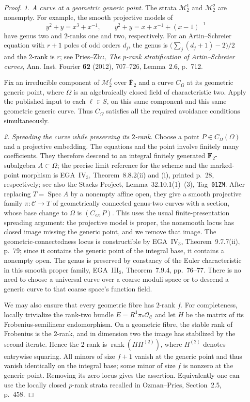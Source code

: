 \begin{proof}
\emph{1. A curve at a geometric generic point.}
The strata $\mathcal M_2^1$ and $\mathcal M_2^2$ are nonempty.  For
example, the smooth projective models of
\[
 y^2+y=x^3+x^{-1},\qquad
 y^2+y=x+x^{-1}+(x-1)^{-1}
\]
have genus two and $2$-ranks one and two, respectively.  For an
Artin--Schreier equation with $r+1$ poles of odd orders $d_j$, the
genus is $\bigl(\sum_j(d_j+1)-2\bigr)/2$ and the $2$-rank is $r$;
see Pries--Zhu, \emph{The $p$-rank stratification of Artin--Schreier
curves}, Ann. Inst. Fourier \textbf{62} (2012), 707--726,
Lemma~2.6, p.~712.

Fix an irreducible component of $\mathcal M_2^f$ over
$\overline{\mathbf F}_2$ and a curve $C_\Omega$ at its geometric generic
point, where $\Omega$ is an algebraically closed field of characteristic
two.  Apply the published input to each $\ell\in S$, on this same
component and this same geometric generic curve.  Thus $C_\Omega$
satisfies all the required avoidance conditions simultaneously.

\emph{2. Spreading the curve while preserving its $2$-rank.}
Choose a point $P\in C_\Omega(\Omega)$ and a projective embedding.
The equations and the point involve finitely many coefficients.
They therefore descend to an integral finitely generated
$\mathbf F_2$-subalgebra $A\subset\Omega$; the precise limit reference
for the scheme and the marked-point morphism is EGA~IV$_3$,
Theorem~8.8.2(ii) and (i), printed p.~28, respectively;
see also the Stacks Project, Lemma~32.10.1(1)--(3),
Tag~\texttt{01ZM}.
After replacing
$T=\operatorname{Spec}A$ by a nonempty affine open, they give a smooth
projective family $\pi:\mathcal C\to T$ of geometrically connected
genus-two curves with a section, whose base change to $\Omega$ is
$(C_\Omega,P)$.  This uses the usual finite-presentation spreading
argument: the projective model is proper, the nonsmooth locus has
closed image missing the generic point, and we remove that image.
The geometric-connectedness locus is constructible by EGA~IV$_3$,
Theorem~9.7.7(ii), p.~79; since it contains the generic point of
the integral base, it contains a nonempty open.  The genus is
preserved by constancy of the Euler characteristic in this smooth
proper family, EGA~III$_2$, Theorem~7.9.4, pp.~76--77.
There is no need to choose a universal curve over a coarse moduli
space or to descend a generic curve to that coarse space's function
field.

We may also ensure that every geometric fibre has $2$-rank $f$.
For completeness, locally trivialize the rank-two bundle
$E=R^1\pi_*\mathcal O_{\mathcal C}$ and let $H$ be the matrix of its
Frobenius-semilinear endomorphism.  On a geometric fibre, the stable
rank of Frobenius is the $2$-rank, and in dimension two the image has
stabilized by the second iterate.  Hence the $2$-rank is
$\operatorname{rank}(H H^{(2)})$, where $H^{(2)}$ denotes entrywise
squaring.  All minors of size $f+1$ vanish at the generic point and
thus vanish identically on the integral base; some minor of size $f$
is nonzero at the generic point.  Removing its zero locus gives the
assertion.  Equivalently one can use the locally closed $p$-rank
strata recalled in Ozman--Pries, Section~2.5, p.~458.


\end{proof}
